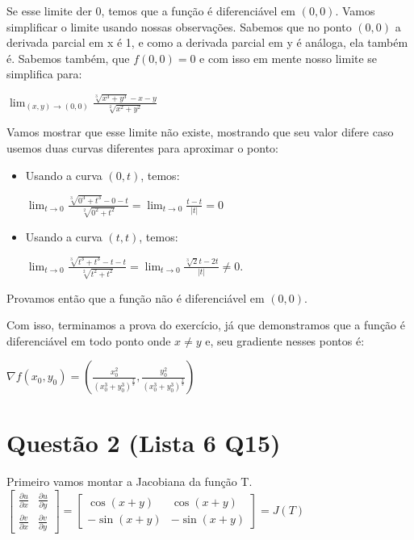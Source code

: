 \documentclass[11pt]{article}
\begin{document}
Se esse limite der 0, temos que a função é diferenciável em \((0, 0)\).
Vamos simplificar o limite usando nossas observações.
Sabemos que no ponto \((0, 0)\) a derivada parcial em x
é 1, e como a derivada parcial em y é análoga, ela também é.
Sabemos também, que \(f(0, 0) = 0\) e com isso em mente nosso
limite se simplifica para:

\(\displaystyle\lim_{(x, y) \to (0, 0)}{\frac{\sqrt[3]{x^3+y^3}-x-y}{\sqrt[2]{x^2+y^2}}}\)

Vamos mostrar que esse limite não existe, mostrando que
seu valor difere caso usemos duas curvas diferentes para
aproximar o ponto:

\begin{itemize}
\item Usando a curva \((0, t)\), temos:

\(\displaystyle\lim_{t \to 0}{\frac{\sqrt[3]{0^3+t^3}-0-t}{\sqrt[2]{0^2+t^2}}} =
    \lim_{t \to 0}{\frac{t-t}{|t|}} = 0\)

\item Usando a curva \((t, t)\), temos:

\(\displaystyle\lim_{t \to 0}{\frac{\sqrt[3]{t^3+t^3}-t-t}{\sqrt[2]{t^2+t^2}}} =
    \lim_{t \to 0}{\frac{\sqrt[3]{2}t-2t}{|t|}} \neq 0\).
\end{itemize}

Provamos então que a função não é diferenciável em \((0, 0)\).

Com isso, terminamos a prova do exercício,
já que demonstramos que a função é diferenciável em
todo ponto onde \(x \neq y\) e, seu gradiente nesses pontos é:  

\(\displaystyle\nabla{f(x_0, y_0)} = \left(\frac{x_0^2}{(x_0^3+y_0^3)^{\frac{2}{3}}}, \frac{y_0^2}{(x_0^3+y_0^3)^{\frac{2}{3}}}\right)\)

\newpage
\section{Questão 2 (Lista 6 Q15)}
\label{sec:org1b33fa6}
\paragraph{}Primeiro vamos montar a Jacobiana da função T.\\

\(\displaystyle\begin{bmatrix}
  \frac{\partial{u}}{\partial{x}} & \frac{\partial{u}}{\partial{y}} \\
  \frac{\partial{v}}{\partial{x}} & \frac{\partial{v}}{\partial{y}}
  \end{bmatrix} = 
  \begin{bmatrix}
  \cos{(x+y)} & \cos{(x+y)}\\
  -\sin{(x+y)} & -\sin{(x+y)}
  \end{bmatrix} = J(T)\)
\end{document}
